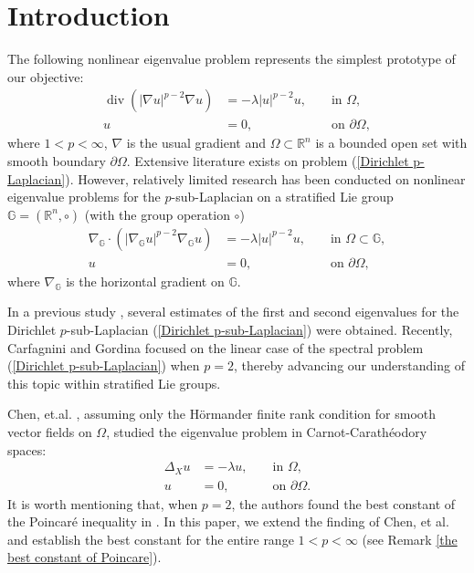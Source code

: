 \documentclass[a4paper,12pt,reqno]{amsart}
\renewcommand\eqref[1]{(\ref{#1})} %
\numberwithin{equation}{section}
\theoremstyle{plain}
\theoremstyle{definition}
\begin{document}
\section{Introduction}
The following nonlinear eigenvalue problem represents the simplest prototype of our objective:
\begin{equation}\label{Dirichlet p-Laplacian}
\begin{aligned}
\operatorname{div}\left(|\nabla u|^{p-2} \nabla u\right)&=-\lambda|u|^{p-2} u,  &&\text { in } \Omega, \\
u&=0,
&&\text { on } \partial \Omega,
\end{aligned}
\end{equation}
where $1<p<\infty$, $\nabla$ is the usual gradient and $\Omega\subset\mathbb{R}^{n}$ is a bounded open set with smooth boundary $\partial\Omega$.  Extensive literature exists on problem \eqref{Dirichlet p-Laplacian}. However, relatively limited research has been conducted on nonlinear eigenvalue problems for the $p$-sub-Laplacian on a stratified Lie group $\mathbb{G}=\left(\mathbb{R}^{n}, \circ\right)$ (with the group operation $\circ$)
\begin{equation}\label{Dirichlet p-sub-Laplacian}
\begin{aligned}
\nabla_{\mathbb{G}} \cdot\left(\left|\nabla_{\mathbb{G}} u\right|^{p-2} \nabla_{\mathbb{G}} u\right)&=-\lambda|u|^{p-2} u,  &&\text { in } \Omega\subset \mathbb{G}, \\
u&=0,
&&\text { on } \partial \Omega,
\end{aligned}
\end{equation}
where $\nabla_{\mathbb{G}}$ is the horizontal gradient on $\mathbb{G}$.

In a previous study \cite{WNL2009}, several estimates of the first and second eigenvalues for the Dirichlet $p$-sub-Laplacian \eqref{Dirichlet p-sub-Laplacian} were obtained. Recently, Carfagnini and Gordina \cite{CG2022} focused on the linear case of the spectral problem \eqref{Dirichlet p-sub-Laplacian} when $p=2$, thereby advancing our understanding of this topic within stratified Lie groups.

Chen, et.al. \cite{Chen2021}, assuming only the H\"ormander finite rank condition for smooth vector fields on $\Omega$, studied the eigenvalue problem in Carnot-Carath\'eodory spaces:
\begin{equation}\label{Dirichlet sub-Laplacian type}
\begin{aligned}
\Delta_{X} u&=-\lambda u,  &&\text { in } \Omega, \\
u&=0,
&&\text { on } \partial \Omega.
\end{aligned}
\end{equation}
It is worth mentioning that, when $p=2$, the authors found the best constant of the Poincar\'e inequality in \cite{Chen2021}. In this paper, we extend the finding of Chen, et al. \cite{Chen2021} and establish the best constant for the entire range $1<p<\infty$ (see Remark \ref{the best constant of Poincare}).
\end{document}
